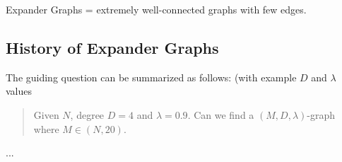 \begin{definition}
	Expander Graphs = extremely well-connected graphs with few edges. 	
\end{definition}

\subsection{History of Expander Graphs}
The guiding question can be summarized as follows: (with example $D$ and $\lambda$ values 
\begin{quote}
	Given $N$, degree $D = 4$ and $\lambda = 0.9$. Can we find a $(M, D, \lambda)$-graph where $M \in (N, 20)$. 
\end{quote}

...
